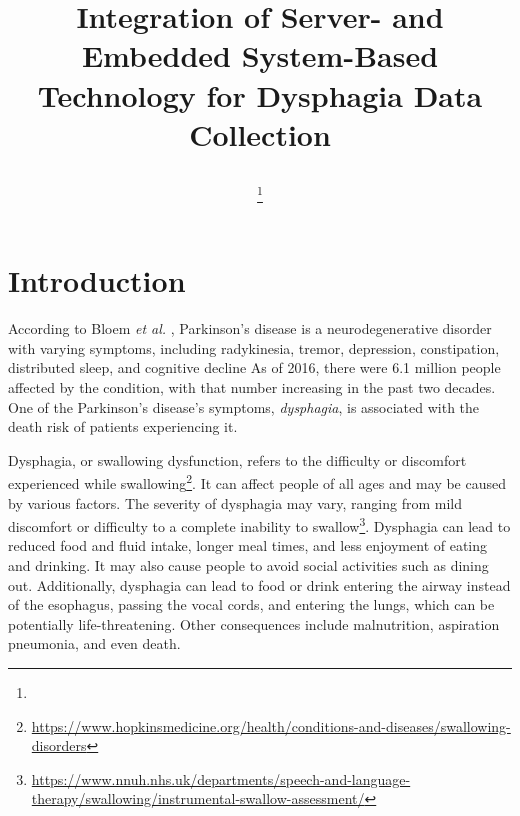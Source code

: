 \documentclass[lettersize,journal]{IEEEtran}
\begin{document}
\title{ Integration of Server- and Embedded System-Based Technology for Dysphagia Data Collection
\author{




\thanks{

}
}
}
\markboth{}%
{}

\maketitle


\section{Introduction}

According to Bloem \textit{et al.} \cite{bloem2021PD}, Parkinson's disease is a
neurodegenerative disorder with varying symptoms, including
radykinesia, tremor, depression, constipation, distributed sleep, and cognitive decline
As of 2016, there were 6.1 million people affected by the condition,
with that number increasing in the past two decades.
One of the Parkinson's disease's symptoms, \textit{dysphagia}, is associated with the
death risk of patients experiencing it.


Dysphagia, or swallowing dysfunction, refers to the difficulty or discomfort experienced while swallowing\footnote{\url{https://www.hopkinsmedicine.org/health/conditions-and-diseases/swallowing-disorders}}. It can affect people of all ages and may be caused by various factors. The severity of dysphagia may vary, ranging from mild discomfort or difficulty to a complete inability to swallow\footnote{\url{https://www.nnuh.nhs.uk/departments/speech-and-language-therapy/swallowing/instrumental-swallow-assessment/}}. Dysphagia can lead to reduced food and fluid intake, longer meal times, and less enjoyment of eating and drinking. It may also cause people to avoid social activities such as dining out. Additionally, dysphagia can lead to food or drink entering the airway instead of the esophagus, passing the vocal cords, and entering the lungs, which can be potentially life-threatening. Other consequences include malnutrition, aspiration pneumonia, and even death.
\\
\end{document}
